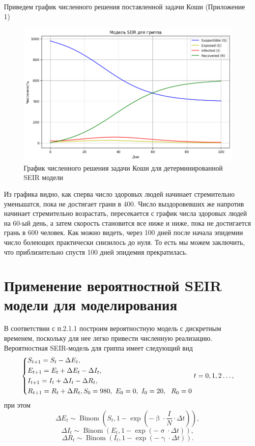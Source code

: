 \documentclass[a4paper, 14pt]{extreport}
\renewcommand{\beta}{\upbeta}
\renewcommand{\gamma}{\upgamma}
\renewcommand{\sigma}{\upsigma}
\newcommand{\Binom}{\operatorname{Binom}}
\begin{document}
	 Приведем график численного решения поставленной задачи Коши (Приложение 1)
	 
	 \begin{figure}[h]
	 	\centering
	 	\includegraphics[scale=0.6]{images/graph01}
	 	\caption{График численного решения задачи Коши для детерминированной SEIR модели}
	 	\label{fig:graph01}
	 \end{figure}
	 
	 Из графика видно, как сперва число здоровых людей начинает стремительно уменьшатся, пока не достигает грани в 400. Число выздоровевших же напротив начинает стремительно возрастать, пересекается с график числа здоровых людей на 60-ый день, а затем скорость становится все ниже и ниже, пока не достигается грань в 600 человек. Как можно видеть, через 100 дней после начала эпидемии число болеющих практически снизилось до нуля. То есть мы можем заключить, что приблизительно спустя 100 дней эпидемия прекратилась.
	\section{Применение вероятностной SEIR модели для моделирования}
	В соответствии с п.2.1.1 построим вероятностную модель с дискретным временем, поскольку для нее легко привести численную реализацию. Вероятностная SEIR-модель для гриппа имеет следующий вид
	\begin{equation}
		\begin{dcases}
			S_{t+1} = S_t - \Delta E_t,\\
			E_{t+1} = E_t +\Delta E_t - \Delta I_t,\\
			I_{t+1} = I_t + \Delta I_t - \Delta R_t,\\
			R_{t+1} = R_t + \Delta R_t,
			S_0 = 980,\ E_0 = 0,\ I_0 = 20,\ \ R_0 = 0
		\end{dcases}
		t = 0,1,2\ldots,
	\end{equation}
	при этом
	$$\Delta E_t \sim \Binom\left(S_t, 
	1 - \exp\left(-\beta\cdot  \frac{I}{N} \cdot \Delta t\right)\right),$$
	$$\Delta I_t \sim \Binom\left(E_t, 1 - \exp\left(-\sigma \cdot \Delta t\right)\right),$$
	$$\Delta R_t \sim \Binom\left(I_t, 1 - \exp\left(-\gamma \cdot \Delta t\right)\right).$$
	
\end{document}
